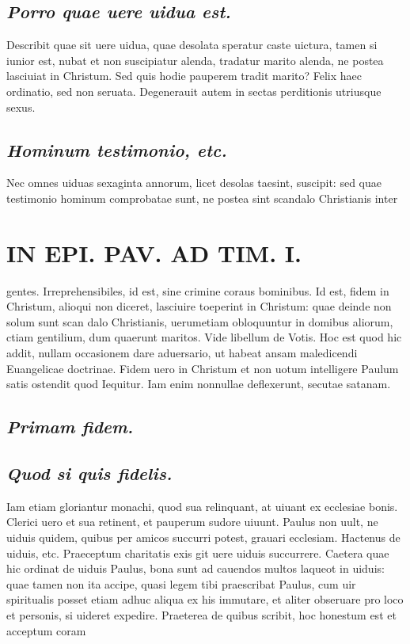\documentclass{article}
\begin{document}
\begin{pages}
\subsection*{\textit{Porro quae uere uidua est. }}\pstart Describit quae sit uere uidua, quae desolata speratur caste uictura, tamen si iunior est, nubat et non suscipiatur alenda, tradatur marito alenda, ne postea lasciuiat in Christum. Sed quis hodie pauperem tradit marito? Felix haec ordinatio, sed non seruata. Degenerauit autem in sectas perditionis utriusque sexus.  \pend
{}
{}
\subsection*{\textit{Hominum testimonio, etc. }}\pstart Nec omnes uiduas sexaginta annorum, licet desolas taesint, suscipit: sed quae testimonio hominum comprobatae sunt, ne postea sint scandalo Christianis inter  \pend
\section*{IN EPI. PAV. AD TIM. I. }
\marginpar{[ p.95 ]}\pstart gentes. Irreprehensibiles, id est, sine crimine coraus bominibus.  \pend\pstart Id est, fidem in Christum, alioqui non diceret, lasciuire toeperint in Christum: quae deinde non solum sunt scan dalo Christianis, uerumetiam obloquuntur in domibus aliorum, ctiam gentilium, dum quaerunt maritos. Vide libellum de Votis. Hoc est quod hic addit, nullam occasionem dare aduersario, ut habeat ansam maledicendi Euangelicae doctrinae. Fidem uero in Christum et non uotum intelligere Paulum satis ostendit quod Iequitur. Iam enim nonnullae deflexerunt, secutae satanam.  \pend
{}
{}
\subsection*{\textit{Primam fidem. }}
{}
\subsection*{\textit{Quod si quis fidelis. }}\pstart Iam etiam gloriantur monachi, quod sua relinquant, at uiuant ex ecclesiae bonis. Clerici uero et sua retinent, et pauperum sudore uiuunt. Paulus non uult, ne uiduis quidem, quibus per amicos succurri potest, grauari ecclesiam.  \pend\pstart Hactenus de uiduis, etc. Praeceptum charitatis exis git uere uiduis succurrere. Caetera quae hic ordinat de uiduis Paulus, bona sunt ad cauendos multos laqueot in uiduis: quae tamen non ita accipe, quasi legem tibi praescribat Paulus, cum uir spiritualis posset etiam adhuc aliqua ex his immutare, et aliter obseruare pro loco et personis, si uideret expedire. Praeterea de quibus scribit, hoc honestum est et acceptum coram  \pend

\end{pages}
\end{document}
